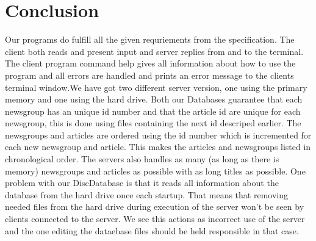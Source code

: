 \documentclass[a4paper]{article}
\begin{document}
\section{Conclusion}            %
Our programs do fulfill all the given requriements from the specification. The client both reads and present input and server replies from and to the terminal. The client program command help gives all information about how to use the program and all errors are handled and prints an error message to the clients terminal window.\newline \newline We have got two different server version, one using the primary memory and one using the hard drive. Both our Databases guarantee that each newsgroup has an unique id number and that the article id are unique for each newsgroup, this is done using files containing the next id descriped earlier. The newsgroups and articles are ordered using the id number which is incremented for each new newsgroup and article. This makes the articles and newsgroups listed in chronological order. The servers also handles as many (as long as there is memory) newsgroups and articles as possible with as long titles as possible. 
\newline \newline
One problem with our DiscDatabase is that it reads all information about the database from the hard drive once each startup. That means that removing needed files from the hard drive during execution of the server won't be seen by clients connected to the server. We see this actions as incorrect use of the server and the one editing the dataebase files should be held responsible in that case.

\newpage
\end{document}
